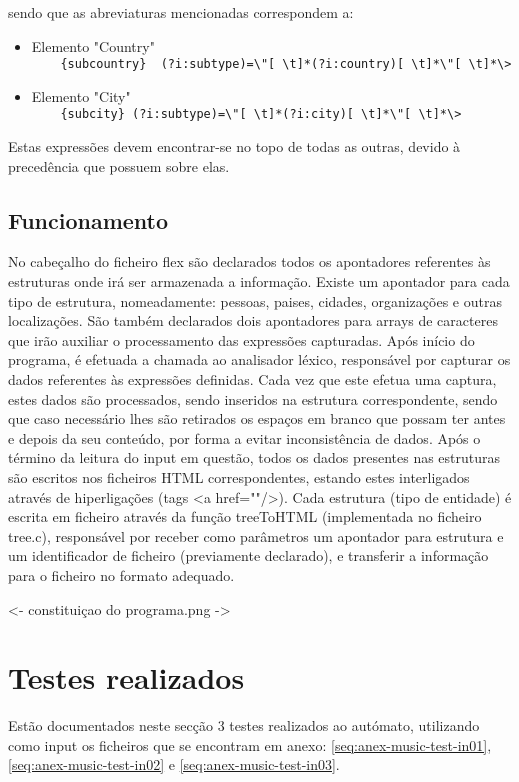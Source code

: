 sendo que as abreviaturas mencionadas correspondem a:

\begin{itemize}
\item Elemento "Country"\\
	 \verb!    {subcountry}  (?i:subtype)=\"[ \t]*(?i:country)[ \t]*\"[ \t]*\>!
\item Elemento "City"\\
	 \verb!    {subcity} (?i:subtype)=\"[ \t]*(?i:city)[ \t]*\"[ \t]*\>!
     
\end{itemize}

Estas expressões devem encontrar-se no topo de todas as outras, devido à precedência que possuem sobre elas.

\subsection{Funcionamento}
\label{seq:enamex-func}

No cabeçalho do ficheiro flex são declarados todos os apontadores referentes às estruturas onde irá ser armazenada a informação. Existe um apontador para cada tipo de estrutura, nomeadamente: pessoas, paises, cidades, organizações e outras localizações. São também declarados dois apontadores para arrays de caracteres que irão auxiliar o processamento das expressões capturadas. Após início do programa, é efetuada a chamada ao analisador léxico, responsável por capturar os dados referentes às expressões definidas. Cada vez que este efetua uma captura, estes dados são processados, sendo inseridos na estrutura correspondente, sendo que caso necessário lhes são retirados os espaços em branco que possam ter antes e depois da seu conteúdo, por forma a evitar inconsistência de dados. Após o término da leitura do input em questão, todos os dados presentes nas estruturas são escritos nos ficheiros HTML correspondentes, estando estes interligados através de hiperligações (tags <a href=""/>). Cada estrutura (tipo de entidade) é escrita em ficheiro através da função treeToHTML (implementada no ficheiro tree.c), responsável por receber como parâmetros um apontador para estrutura e um identificador de ficheiro (previamente declarado), e transferir a informação para o ficheiro no formato adequado.


<- constituiçao do programa.png ->

\section{Testes realizados}
\label{seq:enamex-test}
Estão documentados neste secção 3 testes realizados ao autómato, utilizando como input os ficheiros que se encontram em anexo: \ref{seq:anex-music-test-in01}, \ref{seq:anex-music-test-in02} e \ref{seq:anex-music-test-in03}.

